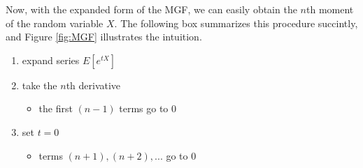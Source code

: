 \noindent Now, with the expanded form of the MGF, we can easily obtain the $n$th moment of the random variable $X$. The following box summarizes this procedure succintly, and Figure \ref{fig:MGF} illustrates the intuition. \\

\begin{tcolorbox}[colback=white!90!gray, title=Intuition: Find the $n$th moment of $X$]
\begin{enumerate}
    \item expand series $E[e^{tX}]$
    \item take the $n$th derivative
    \begin{itemize}
        \item the first $(n-1)$ terms go to 0 
    \end{itemize}
    \item set $t=0$
    \begin{itemize}
        \item terms $(n+1), (n+2), ...$ go to 0
    \end{itemize}
\end{enumerate}
\end{tcolorbox}

